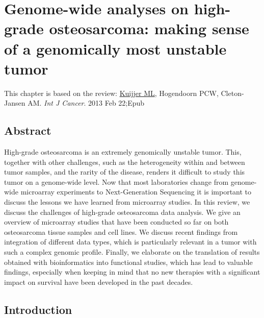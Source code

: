 

%


\chapter{Genome\hyp{}wide analyses on high-grade osteosarcoma: making sense of a genomically most unstable tumor}\label{ch2}
\thispagestyle{empty}				%

\vfill

\vspace{0.5cm}
This chapter is based on the review:
\underline{Kuijjer ML}, Hogendoorn PCW, Cleton-Jansen AM. \emph{Int J Cancer}. 2013 Feb 22;Epub

\newpage


%
\section{Abstract}\label{abstract2}
High-grade osteosarcoma is an extremely genomically unstable tumor. This, together with other challenges, such as the
heterogeneity within and between tumor samples, and the rarity of the disease, renders it difficult to study this tumor on a
genome\hyp{}wide level. Now that most laboratories change from genome\hyp{}wide microarray experiments to Next\hyp{}Generation
Sequencing it is important to discuss the lessons we have learned from microarray studies. In this review, we discuss the
challenges of high\hyp{}grade osteosarcoma data analysis. We give an overview of microarray studies that have been conducted so far on both osteosarcoma tissue samples and cell lines. We discuss recent findings from integration of different data types,
which is particularly relevant in a tumor with such a complex genomic profile. Finally, we elaborate on the
translation of results obtained with bioinformatics into functional studies, which has lead to valuable findings, especially
when keeping in mind that no new therapies with a significant impact on survival have been developed in the past decades.

%
\section{Introduction}\label{introduction2}

